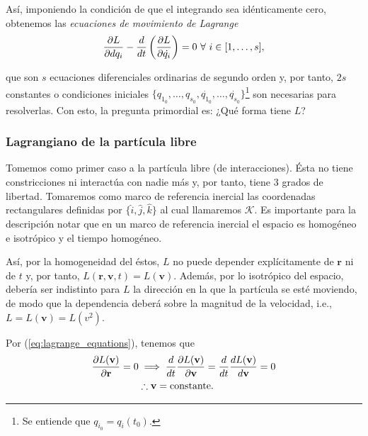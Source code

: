 Así, imponiendo la condición de que el integrando sea idénticamente cero, obtenemos las \textit{ecuaciones de movimiento de Lagrange}
\begin{equation}
 \frac{\partial L}{\partial d q_i} - \frac{d}{dt} \left( \frac{\partial L}{\partial  \dot{q_i} } \right) = 0 \ \forall \ i \in [1, \ldots, s],
 \label{eq:lagrange_equations}
\end{equation}

que son $s$ ecuaciones diferenciales ordinarias de segundo orden y, por tanto, $2s$ constantes o condiciones iniciales $\{ q_{1_0}, \ldots, q_{s_0}, \dot{q_{1_0}}, \ldots, \dot{q_{s_0}} \}$\footnote{Se entiende que $q_{i_0} = q_i(t_0)$.} son necesarias para resolverlas. Con esto, la pregunta primordial es: ¿Qué forma tiene $L$?

\subsubsection{Lagrangiano de la partícula libre}

Tomemos como primer caso a la partícula libre (de interacciones). Ésta no tiene constricciones ni interactúa con nadie más y, por tanto, tiene 3 grados de libertad. Tomaremos como marco de referencia inercial las coordenadas rectangulares definidas por $\{ \hat{i}, \hat{j}, \hat{k} \}$ al cual llamaremos $\mathcal{K}$. Es importante para la descripción notar que en un marco de referencia inercial el espacio es homogéneo e isotrópico y el tiempo homogéneo. 

Así, por la homogeneidad del éstos, $L$ no puede depender explícitamente de $\mathbf{r}$ ni de $t$ y, por tanto, $L(\mathbf{r},\mathbf{v},t) = L(\mathbf{v})$. Además, por lo isotrópico del espacio, debería ser indistinto para $L$ la dirección en la que la partícula se esté moviendo, de modo que la dependencia deberá sobre la magnitud de la velocidad, i.e., $L = L(\mathbf{v}) = L(v^2)$.

Por (\ref{eq:lagrange_equations}), tenemos que 
 \begin{align*}
 \frac{\partial L(\mathbf{v}) }{\partial  \mathbf{r} } = 0 &\implies \frac{d}{dt}\frac{\partial L(\mathbf{v})}{\partial \mathbf{v}} = \frac{d}{dt} \frac{dL(\mathbf{v})}{d\mathbf{v}} = 0 \\ 
 &\therefore \mathbf{v} = \text{constante}.
 \end{align*}


